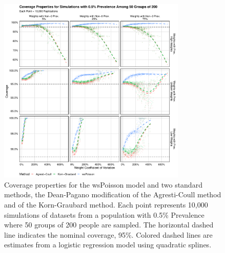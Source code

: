 \documentclass[AMA,STIX1COL]{WileyNJD-v2}
\begin{document}
\begin{figure}
\centering
\includegraphics[width=0.8\textwidth]{figures/perfect_coverage_50_groups_0_005_prev.pdf}
\caption{Coverage properties for the wsPoisson model and two standard methods, the Dean-Pagano modification of the Agresti-Coull method and of the Korn-Graubard method.
Each point represents 10,000 simulations of datasets from a population with 0.5\% Prevalence where 50 groups of 200 people are sampled.
The horizontal dashed line indicates the nominal coverage, 95\%.
Colored dashed lines are estimates from a logistic regression model using quadratic splines.}
\label{fig:perfect_coverage_50_groups_0_005_prev}
\end{figure}
\end{document}
